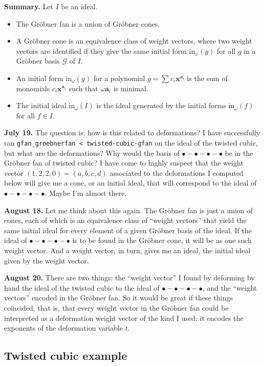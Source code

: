 \medskip\noindent
{\bf Summary.} Let $I$ be an ideal.
\begin{itemize}
\item The Gröbner fan is a union of Gröbner cones.
\item A Gröbner cone is an equivalence class of weight vectors, 
where two weight vectors are identified if they give the same initial form
$\text{in}_\omega(g)$ for all $g$ in a Gröbner basis $\mathcal{G}$ of $I.$
\item An initial form $\text{in}_\omega(g)$ for a polynomial 
$g = \sum c_i\mathbf{x}^{\mathbf{a}_i}$ is the sum of monomials 
$c_i\mathbf{x}^{\mathbf{a}_i}$ such that $\omega \mathbf{a}_i$ is minimal.
\item The initial ideal $\text{in}_\omega(I)$ is the ideal generated by the
initial forms $\text{in}_\omega(f)$ for all $f \in I$.
\end{itemize}

{\bf July 19.} The question is: how is this related to deformations? I have
successfully ran \texttt{gfan\_groebnerfan < twisted-cubic-gfan} on the ideal of
the twisted cubic, but what are the deformations? Why would the basis of
$\bullet-\bullet-\bullet-\bullet$ be in the Gröbner fan of twisted cubic? I have
come to highly suspect that the weight vector $(1,2,2,0)=(a,b,c,d)$ associated
to the deformations I computed below will give me a cone, or an initial ideal,
that will correspond to the ideal of $\bullet-\bullet-\bullet-\bullet$. Maybe
I'm almost there.

{\bf August 18.} Let me think about this again. 
The Gröbner fan is just a union of cones,
each of which is an equivalence class of ``weight vectors'' that yield the same
initial ideal for every element of a given Gröbner basis of the ideal.
If the ideal of $\bullet-\bullet-\bullet-\bullet$ is to be found in 
the Gröbner cone, it will be as one such weight vector.
And a weight vector, in turn, gives me an ideal, the initial ideal given by the
weight vector.

{\bf August 20.} There are two things: the ``weight vector'' I found by
deforming by hand the ideal of the twisted cubic to the ideal of 
$\bullet-\bullet-\bullet-\bullet$, and the ``weight vectors'' encoded in the
Gröbner fan. So it would be great if these things coincided, that is, 
that every weight vector in the Gröbner fan could be interpreted as a
deformation weight vector of the kind I used: it encodes the exponents of the
deformation variable $t$.

\subsection{Twisted cubic example}
\label{subsection-twisted-cubic-example}

